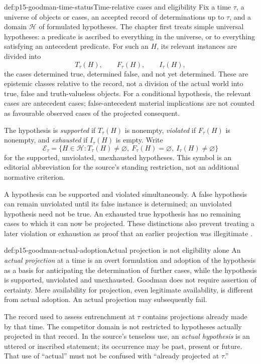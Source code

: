 \begin{hbdefinition}{def:p15-goodman-time-status}{Time-relative cases and eligibility}
Fix a time $\tau$, a universe of objects or cases, an accepted record of
determinations up to $\tau$, and a domain $\mathcal H$ of formulated
hypotheses. The chapter first treats simple universal hypotheses: a
predicate is ascribed to everything in the universe, or to everything
satisfying an antecedent predicate. For such an $H$, its relevant
instances are divided into
\[
 T_\tau(H),\qquad F_\tau(H),\qquad I_\tau(H),
\]
the cases determined true, determined false, and not yet determined.
These are epistemic classes relative to the record, not a division of
the actual world into true, false and truth-valueless objects.
For a conditional hypothesis, the relevant cases are antecedent cases;
false-antecedent material implications are not counted as favourable
observed cases of the projected consequent.

The hypothesis is \emph{supported} if $T_\tau(H)$ is nonempty,
\emph{violated} if $F_\tau(H)$ is nonempty, and \emph{exhausted} if
$I_\tau(H)$ is empty. Write
\[
 \mathcal E_\tau
 =\{H\in\mathcal H:T_\tau(H)\ne\varnothing,
       \ F_\tau(H)=\varnothing,\ I_\tau(H)\ne\varnothing\}
\]
for the supported, unviolated, unexhausted hypotheses. This symbol is an
editorial abbreviation for the source's standing restriction, not an
additional normative criterion.
\end{hbdefinition}

A hypothesis can be supported and violated simultaneously. A false
hypothesis can remain unviolated until its false instance is determined;
an unviolated hypothesis need not be true. An exhausted true hypothesis
has no remaining cases to which it can now be projected. These distinctions
also prevent treating a later violation or exhaustion as proof that an
earlier projection was illegitimate \parencite[IV.2--3, pp.~89--93]{Goodman1983FourthProjection}.

\begin{hbdefinition}{def:p15-goodman-actual-adoption}{Actual projection is not eligibility alone}
An \emph{actual projection} at a time is an overt formulation and adoption
of the hypothesis as a basis for anticipating the determination of further
cases, while the hypothesis is supported, unviolated and unexhausted.
Goodman does not require assertion of certainty. Mere availability for
projection, even legitimate availability, is different from actual adoption.
An actual projection may subsequently fail.

The record used to assess entrenchment at $\tau$ contains projections
already made by that time. The competitor domain is not restricted to
hypotheses actually projected in that record. In the source's tenseless
use, an \emph{actual hypothesis} is an uttered or inscribed statement;
its occurrence may be past, present or future. That use of ``actual''
must not be confused with ``already projected at $\tau$.''
\end{hbdefinition}

